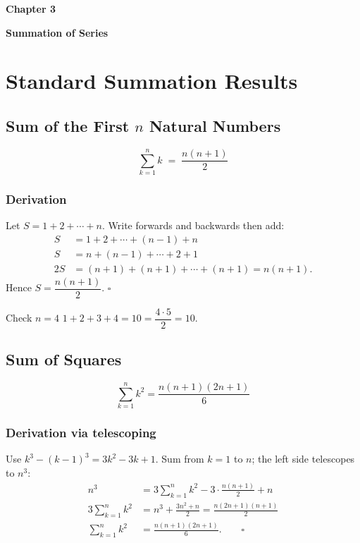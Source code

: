 \documentclass[12pt,a4paper]{article}
\theoremstyle{defstyle}
\newcommand{\sumk}{\sum_{k=1}^{n}}
\newcommand{\chapterbanner}[2]{%
  \clearpage
  \begin{tcolorbox}[colback=chaptercol!10, colframe=chaptercol,
      left=10pt, right=10pt, top=8pt, bottom=8pt]
    {\large\bfseries\color{chaptercol} Chapter #1}\par\vspace{2pt}
    {\LARGE\bfseries #2}
  \end{tcolorbox}
  \vspace{6pt}
}
\begin{document}
\chapterbanner{3}{Summation of Series}

\section{Standard Summation Results}

\subsection{Sum of the First \(n\) Natural Numbers}

\begin{result}{}{}
\[
  \sumk k \;=\; \frac{n(n+1)}{2}
\]
\end{result}

\subsubsection*{Derivation}
Let \(S = 1 + 2 + \cdots + n\). Write forwards and backwards then add:
\[
\begin{aligned}
  S  &= 1 + 2 + \cdots + (n-1) + n \\
  S  &= n + (n-1) + \cdots + 2 + 1 \\
  2S &= (n+1)+(n+1)+\cdots+(n+1) = n(n+1).
\end{aligned}
\]
Hence \(S = \dfrac{n(n+1)}{2}\). \qquad\(\square\)

\begin{example}{Check $n=4$}{}
$1+2+3+4=10=\dfrac{4\cdot5}{2}=10$. \checkmark
\end{example}

\subsection{Sum of Squares}

\begin{result}{}{}
\[
  \sumk k^2 = \frac{n(n+1)(2n+1)}{6}
\]
\end{result}

\subsubsection*{Derivation via telescoping}
Use \(k^3-(k-1)^3 = 3k^2-3k+1\). Sum from \(k=1\) to \(n\); the left side telescopes to \(n^3\):
\[
\begin{aligned}
  n^3 &= 3\sumk k^2 - 3\cdot\frac{n(n+1)}{2}+n \\[4pt]
  3\sumk k^2 &= n^3 + \frac{3n^2+n}{2} = \frac{n(2n+1)(n+1)}{2} \\[4pt]
  \sumk k^2 &= \frac{n(n+1)(2n+1)}{6}. \qquad\square
\end{aligned}
\]
\end{document}
